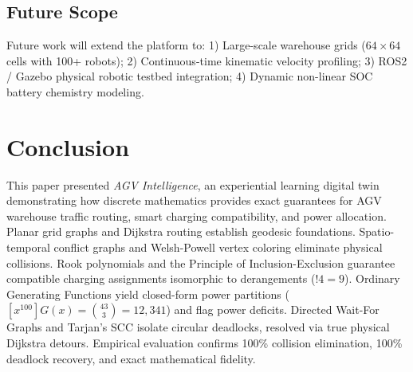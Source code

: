 \documentclass[conference]{IEEEtran}
\begin{document}
\subsection{Future Scope}
Future work will extend the platform to:
1) Large-scale warehouse grids ($64 \times 64$ cells with 100+ robots);
2) Continuous-time kinematic velocity profiling;
3) ROS2 / Gazebo physical robotic testbed integration;
4) Dynamic non-linear SOC battery chemistry modeling.

\section{Conclusion}
This paper presented \textit{AGV Intelligence}, an experiential learning digital twin demonstrating how discrete mathematics provides exact guarantees for AGV warehouse traffic routing, smart charging compatibility, and power allocation. Planar grid graphs and Dijkstra routing establish geodesic foundations. Spatio-temporal conflict graphs and Welsh-Powell vertex coloring eliminate physical collisions. Rook polynomials and the Principle of Inclusion-Exclusion guarantee compatible charging assignments isomorphic to derangements ($!4 = 9$). Ordinary Generating Functions yield closed-form power partitions ($[x^{100}] G(x) = \binom{43}{3} = 12,341$) and flag power deficits. Directed Wait-For Graphs and Tarjan's SCC isolate circular deadlocks, resolved via true physical Dijkstra detours. Empirical evaluation confirms 100\% collision elimination, 100\% deadlock recovery, and exact mathematical fidelity.



\end{document}
